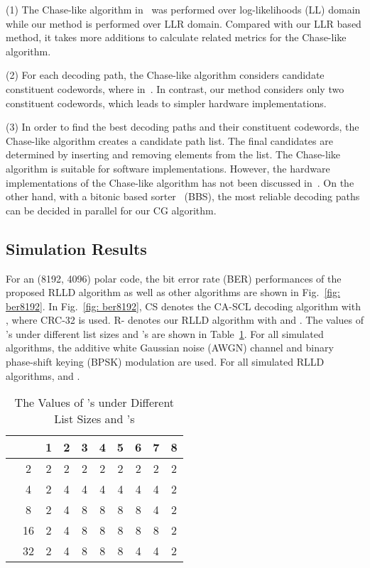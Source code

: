 \documentclass[journal]{IEEEtran}
\begin{document}
(1) The Chase-like algorithm in~\cite{gabi_low_latency} was performed over log-likelihoods (LL) domain while our method is performed over LLR domain. Compared with our LLR based method, it takes more additions to calculate related metrics for the Chase-like algorithm.

(2) For each decoding path, the Chase-like algorithm considers  candidate constituent codewords, where  in~\cite{gabi_low_latency}. In contrast, our method considers only two constituent codewords, which leads to simpler hardware implementations.

(3) In order to find the  best decoding paths and their constituent codewords, the Chase-like algorithm creates a candidate path list. The final  candidates are determined by inserting and removing elements from the list. The Chase-like algorithm is suitable for software implementations. However, the hardware implementations of the Chase-like algorithm has not been discussed in~\cite{gabi_low_latency}. On the other hand, with a bitonic based sorter~\cite{jun_low_mem_list} (BBS), the  most reliable decoding paths can be decided in parallel for our CG algorithm.


\subsection{Simulation Results} \label{ssec: sim1}
For an (8192, 4096) polar code, the bit error rate (BER) performances of the proposed RLLD algorithm as well as other algorithms are shown in Fig.~\ref{fig: ber8192}. In Fig.~\ref{fig: ber8192}, CS denotes the CA-SCL decoding algorithm with , where CRC-32 is used. R- denotes our RLLD algorithm with  and . The values of 's under different list sizes and 's are shown in Table~\ref{tab: m_i}. For all simulated algorithms, the additive white Gaussian noise (AWGN) channel and binary phase-shift keying (BPSK) modulation are used. For all simulated RLLD algorithms,  and .

\begin{table}[hbt]
  \centering
  \caption{The Values of 's under Different List Sizes and 's}
  \label{tab: m_i}
  \footnotesize
  \begin{tabular}{c|c||c|c|c|c|c|c|c|c}
    \hline
   & & 1 & 2 & 3 & 4 & 5 & 6 & 7& 8 \\ \hline\hline
   \multirow{5}{*}{}& 2   & 2         & 2        & 2        & 2         & 2         & 2        &  2       & 2 \\
       &4& 2         & 4        & 4        & 4        & 4         & 4        &  4       & 2 \\
      &8 & 2         &4         & 8        &8         &8          &8         & 4        & 2 \\
      &16 & 2         &4         & 8        &8         &8          &8         & 8        & 2 \\
      & 32& 2         &4         & 8        &8         &8          &4         & 4        & 2 \\ \hline
  \end{tabular}
\end{table}
\end{document}
